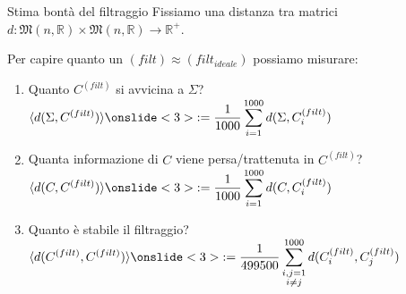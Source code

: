 \documentclass{beamer}
\newcommand{\bbR}{\mathbb{R}}
\newcommand{\1}{\mathbbm{1}}
\begin{document}
\begin{frame}{Stima bontà del filtraggio}
Fissiamo una distanza tra matrici $d:\mathfrak{M}(n,\bbR)\times\mathfrak{M}(n,\bbR) \to \bbR^+$.
\pause
\vspace{10pt}

Per capire quanto un $(filt) \approx (filt_{ideale})$ possiamo misurare:
\vspace{5pt}
\begin{enumerate}
\item Quanto $C^{(filt)}$ si avvicina a $\Sigma$?\\
	\vspace{2pt}
	\quad $\displaystyle\langle d(\Sigma,C^{(filt)}) \rangle \onslide<3>{:= \frac{1}{1000}\sum_{i=1}^{1000} d(\Sigma,C^{(filt)}_i)}$
	\vspace{4pt}
\item Quanta informazione di $C$ viene persa/trattenuta in $C^{(filt)}$?\\
	\vspace{2pt}
	\quad $\displaystyle\langle d(C,C^{(filt)}) \rangle \onslide<3>{:= \frac{1}{1000}\sum_{i=1}^{1000} d(C,C^{(filt)}_i)}$
	\vspace{4pt}
\item Quanto è stabile il filtraggio?\\
	\quad $\displaystyle\langle d(C^{(filt)},C^{(filt)}) \rangle \onslide<3>{:= \frac{1}{499500}\sum_{\substack{i,j=1 \\ i\neq j}}^{1000} d(C^{(filt)}_i,C^{(filt)}_j)}$
\end{enumerate}
\end{frame}
\end{document}
